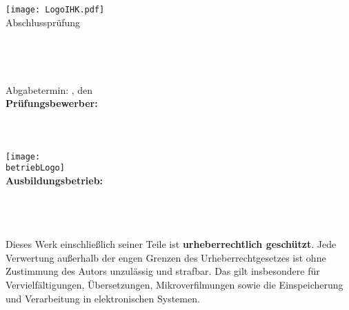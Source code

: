 \begin{titlepage}

    \begin{center}
    \texttt{[image: LogoIHK.pdf]}\\[1ex]
    \Large{Abschlussprüfung \pruefungstermin}\\[3ex]
    
    \Large{\ausbildungsberuf}\\
    \LARGE{\betreff}\\[4ex]
    
    \huge{\textbf{\titel}}\\[1.5ex]
    \Large{\textbf{\untertitel}}\\[4ex]
    
    \normalsize
    Abgabetermin: \abgabeOrt, den \abgabeTermin\\[3em]
    \textbf{Prüfungsbewerber:}\\
    \autorName\\
    \autorAnschrift\\
    \autorOrt\\[5ex]
    
    \texttt{[image: \\betriebLogo]}\\[2ex]
    \textbf{Ausbildungsbetrieb:}\\
    \betriebName\\
    \betriebAnschrift\\
    \betriebOrt\\[5em]
    \end{center}
    
    \small
    \noindent
    Dieses Werk einschließlich seiner Teile ist \textbf{urheberrechtlich geschützt}.
    Jede Verwertung außerhalb der engen Grenzen des Urheberrechtgesetzes ist ohne
    Zustimmung des Autors unzulässig und strafbar. Das gilt insbesondere für
    Vervielfältigungen, Übersetzungen, Mikroverfilmungen sowie die Einspeicherung
    und Verarbeitung in elektronischen Systemen.
    
    \end{titlepage}
